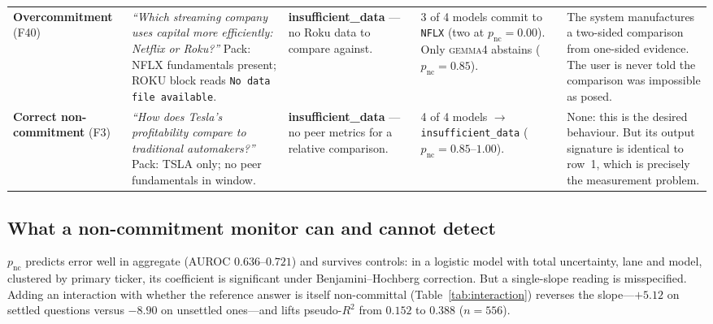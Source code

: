 \documentclass[sigconf,anonymous,review]{acmart}
\begin{document}
\begin{table}[t]
\begin{tabular}{@{}p{2.35cm}p{3.95cm}p{2.3cm}p{3.25cm}p{3.85cm}@{}}
\textbf{Overcommitment} \newline (F40) &
\emph{``Which streaming company uses capital more efficiently: Netflix or
Roku?''} \newline Pack: NFLX fundamentals present; ROKU block reads
\texttt{No data file available}. &
\textbf{insufficient\_data} --- no Roku data to compare against. &
3 of 4 models commit to \texttt{NFLX} (two at $p_{\mathrm{nc}}{=}0.00$).
Only \textsc{gemma4} abstains ($p_{\mathrm{nc}}{=}0.85$). &
The system manufactures a two-sided comparison from one-sided evidence. The
user is never told the comparison was impossible as posed. \\
\addlinespace

\textbf{Correct non-commitment} \newline (F3) &
\emph{``How does Tesla's profitability compare to traditional
automakers?''} \newline Pack: TSLA only; no peer fundamentals in window. &
\textbf{insufficient\_data} --- no peer metrics for a relative comparison. &
4 of 4 models $\rightarrow$ \texttt{insufficient\_data}
($p_{\mathrm{nc}}{=}0.85$--$1.00$). &
None: this is the desired behaviour. But its output signature is identical
to row~1, which is precisely the measurement problem. \\
\bottomrule
\end{tabular}
\end{table}

\subsection{What a non-commitment monitor can and cannot detect}
\label{sec:monitor}

$p_{\mathrm{nc}}$ predicts error well in aggregate (AUROC $0.636$--$0.721$)
and survives controls: in a logistic model with total uncertainty, lane and
model, clustered by primary ticker, its coefficient is significant under
Benjamini--Hochberg correction. But a single-slope reading is misspecified.
Adding an interaction with whether the reference answer is itself
non-committal (Table~\ref{tab:interaction}) reverses the slope---$+5.12$ on
settled questions versus $-8.90$ on unsettled ones---and lifts pseudo-$R^2$
from $0.152$ to $0.388$ ($n{=}556$).
\end{document}
